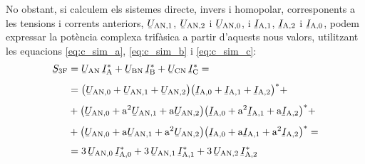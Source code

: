 No obstant, si calculem els sistemes directe, invers i homopolar,
corresponents a les tensions i corrents anteriors,
$\cmplx{U}\ped{AN,1}$, $\cmplx{U}\ped{AN,2}$ i
$\cmplx{U}\ped{AN,0}$, i $\cmplx{I}\ped{A,1}$,
$\cmplx{I}\ped{A,2}$ i $\cmplx{I}\ped{A,0}$, podem
expressar la potència complexa trifàsica a partir d'aquests nous
valors, utilitzant les equacions \eqref{eq:c_sim_a},
\eqref{eq:c_sim_b} i \eqref{eq:c_sim_c}:
\begin{equation}
\begin{split}
   \cmplx{S}\ped{3F} &= \cmplx{U}\ped{AN} \,\cmplx{I}\ped{A}^* +
   \cmplx{U}\ped{BN} \,\cmplx{I}\ped{B}^* +  \cmplx{U}\ped{CN} \,\cmplx{I}\ped{C}^* = \\[1ex]
   &= \big(\cmplx{U}\ped{AN,0} + \cmplx{U}\ped{AN,1} +
   \cmplx{U}\ped{AN,2}\big) \big(\cmplx{I}\ped{A,0} + \cmplx{I}\ped{A,1} +
   \cmplx{I}\ped{A,2}\big)^* +  \\[1ex]
   &+ \big(\cmplx{U}\ped{AN,0} + \au^2 \cmplx{U}\ped{AN,1} +
   \au \cmplx{U}\ped{AN,2} \big) \big(\cmplx{I}\ped{A,0} + \au^2 \cmplx{I}\ped{A,1}
    + \au \cmplx{I}\ped{A,2} \big)^* + \\[1ex]
   &+ \big(\cmplx{U}\ped{AN,0} + \au \cmplx{U}\ped{AN,1} + \au^2
   \cmplx{U}\ped{AN,2} \big) \big(\cmplx{I}\ped{A,0} + \au
   \cmplx{I}\ped{A,1} + \au^2 \cmplx{I}\ped{A,2} \big)^* =  \\[1ex]
   &= 3\, \cmplx{U}\ped{AN,0} \, \cmplx{I}\ped{A,0}^* +
      3\, \cmplx{U}\ped{AN,1} \, \cmplx{I}\ped{A,1}^* +
      3\, \cmplx{U}\ped{AN,2}\,  \cmplx{I}\ped{A,2}^*
    \label{eq:c_sim_s}
\end{split}
\end{equation}


